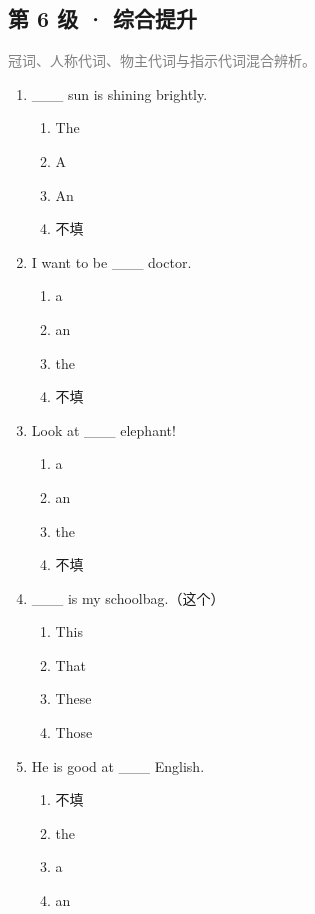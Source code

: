 \documentclass[11pt,a4paper]{ctexart}
\begin{document}
\subsection*{第 6 级 · 综合提升}
\noindent\textcolor{gray}{冠词、人称代词、物主代词与指示代词混合辨析。}\par\smallskip
\begin{enumerate}[leftmargin=*,itemsep=4pt]
\item \_\_\_ sun is shining brightly.
\begin{enumerate}[label=\Alph*.,leftmargin=2em,itemsep=1pt,topsep=2pt]
\item The
\item A
\item An
\item 不填
\end{enumerate}
\item I want to be \_\_\_ doctor.
\begin{enumerate}[label=\Alph*.,leftmargin=2em,itemsep=1pt,topsep=2pt]
\item a
\item an
\item the
\item 不填
\end{enumerate}
\item Look at \_\_\_ elephant!
\begin{enumerate}[label=\Alph*.,leftmargin=2em,itemsep=1pt,topsep=2pt]
\item a
\item an
\item the
\item 不填
\end{enumerate}
\item \_\_\_ is my schoolbag.（这个）
\begin{enumerate}[label=\Alph*.,leftmargin=2em,itemsep=1pt,topsep=2pt]
\item This
\item That
\item These
\item Those
\end{enumerate}
\item He is good at \_\_\_ English.
\begin{enumerate}[label=\Alph*.,leftmargin=2em,itemsep=1pt,topsep=2pt]
\item 不填
\item the
\item a
\item an
\end{enumerate}

\end{enumerate}
\end{document}
